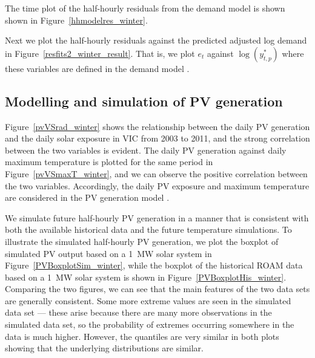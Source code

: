 \documentclass[11pt]{article}
\begin{document}
The time plot of the half-hourly residuals from the demand model is shown shown in Figure~\ref{hhmodelres_winter}.


Next we plot the half-hourly residuals against the predicted adjusted log demand in Figure~\ref{resfits2_winter_result}. That is, we plot
$e_t$ against $\log(y^*_{t,p})$ where these variables are defined in the demand model \citep{Tech15}.




\subsection{Modelling and simulation of PV generation}

Figure~\ref{pvVSrad_winter} shows the relationship between the daily PV generation and the daily solar exposure in VIC from 2003 to 2011, and the strong correlation between the two variables is evident. The daily PV generation against daily maximum temperature is plotted for the same period in Figure~\ref{pvVSmaxT_winter}, and we can observe the positive correlation between the two variables. Accordingly, the daily PV exposure and maximum temperature are considered in the PV generation model \citep{Tech15}.




We simulate future half-hourly PV generation in a manner that is consistent with both the available historical data and the future temperature simulations.
To illustrate the simulated half-hourly PV generation, we plot the boxplot of simulated PV output based on a 1~MW solar system in Figure~\ref{PVBoxplotSim_winter}, while the boxplot of the historical ROAM data based on a 1~MW solar system is shown in Figure~\ref{PVBoxplotHis_winter}. Comparing the two figures, we can see that the main features of the two data sets are generally consistent. Some more extreme values are seen in the simulated data set --- these arise because there are many more observations in the simulated data set, so the probability of extremes occurring somewhere in the data is much higher. However, the quantiles are very similar in both plots showing that the underlying distributions are similar.
\end{document}
